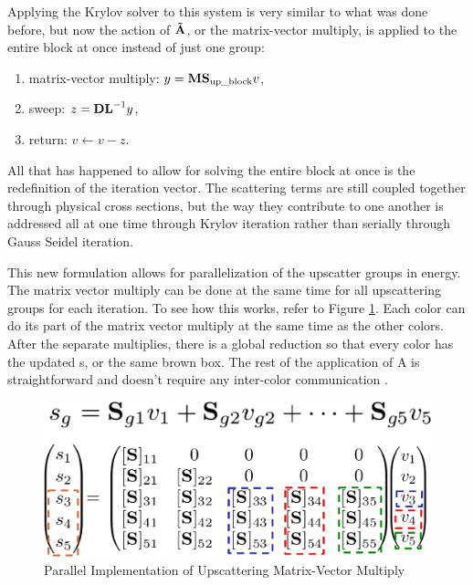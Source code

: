 Applying the Krylov solver to this system is very similar to what was done before, but now the action of $\mathbf{\tilde{A}}$, or the matrix-vector multiply, is applied to the entire block at once instead of just one group:
%
\begin{enumerate}
  \item matrix-vector multiply: $y = \mathbf{M}\mathbf{S}_{\text{up\_block}} v$,
  \item sweep: $z = \mathbf{DL}^{-1} y$,
  \item return: $v \leftarrow v - z$.
\end{enumerate}
%
All that has happened to allow for solving the entire block at once is the redefinition of the iteration vector. The scattering terms are still coupled together through physical cross sections, but the way they contribute to one another is addressed all at one time through Krylov iteration rather than serially through Gauss Seidel iteration. 

This new formulation allows for parallelization of the upscatter groups in energy. The matrix vector multiply can be done at the same time for all upscattering groups for each iteration. To see how this works, refer to Figure \ref{fig:KrylovMultiply}. Each color can do its part of the matrix vector multiply at the same time as the other colors. After the separate multiplies, there is a global reduction so that every color has the updated s, or the same brown box. The rest of the application of A is straightforward and doesn't require any inter-color communication \cite{Evans2010}.
%
\begin{figure}[!h]
  \begin{center}
    \includegraphics [width=.6\textwidth, height=0.2\textheight ] {KrylovGroupMultiply}
  \end{center}
  \caption{Parallel Implementation of Upscattering Matrix-Vector Multiply}
  \label{fig:KrylovMultiply}
\end{figure}

